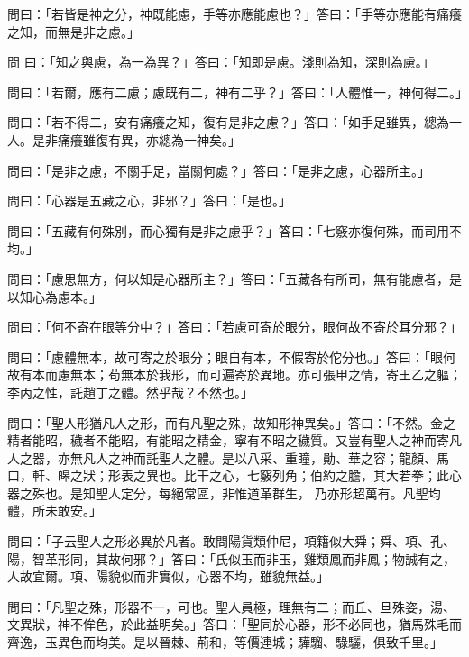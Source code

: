 \begin{pinyinscope}
 問曰：「若皆是神之分，神既能慮，手等亦應能慮也？」答曰：「手等亦應能有痛癢之知，而無是非之慮。」



 問
 曰：「知之與慮，為一為異？」答曰：「知即是慮。淺則為知，深則為慮。」



 問曰：「若爾，應有二慮；慮既有二，神有二乎？」答曰：「人體惟一，神何得二。」



 問曰：「若不得二，安有痛癢之知，復有是非之慮？」答曰：「如手足雖異，總為一人。是非痛癢雖復有異，亦總為一神矣。」



 問曰：「是非之慮，不關手足，當關何處？」答曰：「是非之慮，心器所主。」



 問曰：「心器是五藏之心，非邪？」答曰：「是也。」



 問曰：「五藏有何殊別，而心獨有是非之慮乎？」答曰：「七竅亦復何殊，而司用不均。」



 問曰：「慮思無方，何以知是心器所主？」答曰：「五藏各有所司，無有能慮者，是以知心為慮本。」



 問曰：「何不寄在眼等分中？」答曰：「若慮可寄於眼分，眼何故不寄於耳分邪？」



 問曰：「慮體無本，故可寄之於眼分；眼自有本，不假寄於佗分也。」答曰：「眼何故有本而慮無本；茍無本於我形，而可遍寄於異地。亦可張甲之情，寄王乙之軀；李丙之性，託趙丁之體。然乎哉？不然也。」



 問曰：「聖人形猶凡人之形，而有凡聖之殊，故知形神異矣。」答曰：「不然。金之精者能昭，穢者不能昭，有能昭之精金，寧有不昭之穢質。又豈有聖人之神而寄凡人之器，亦無凡人之神而託聖人之體。是以八采、重瞳，勛、華之容；龍顏、馬口，軒、皞之狀；形表之異也。比干之心，七竅列角；伯約之膽，其大若拳；此心器之殊也。是知聖人定分，每絕常區，非惟道革群生，
 乃亦形超萬有。凡聖均體，所未敢安。」



 問曰：「子云聖人之形必異於凡者。敢問陽貨類仲尼，項籍似大舜；舜、項、孔、陽，智革形同，其故何邪？」答曰：「氏似玉而非玉，雞類鳳而非鳳；物誠有之，人故宜爾。項、陽貌似而非實似，心器不均，雖貌無益。」



 問曰：「凡聖之殊，形器不一，可也。聖人員極，理無有二；而丘、旦殊姿，湯、文異狀，神不侔色，於此益明矣。」答曰：「聖同於心器，形不必同也，猶馬殊毛而齊逸，玉異色而均美。是以晉棘、荊和，等價連城；驊騮、騄驪，俱致千里。」




\end{pinyinscope}
